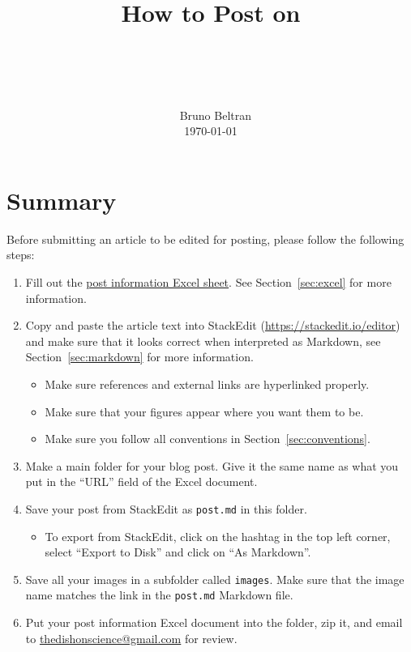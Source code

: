 \documentclass[paper=a4, fontsize=11pt]{scrartcl}
\title{\
        \usefont{OT1}{bch}{b}{n}
        \horrule{0.5pt} \\[0.4cm]
        \huge How to Post on \\ \dishurl{} \\
        \horrule{2pt} \\[0.5cm]
}
\author{\
        \normalfont{}                     \normalsize
        Bruno Beltran\\[-3pt]             \normalsize
        \today
}
\date{}
\numberwithin{equation}{section}        %
\numberwithin{figure}{section}            %
\numberwithin{table}{section}                %
\newcommand{\dishurlplain}[1]{http://thedishonscience.stanford.edu/#1}
\begin{document}
\maketitle

\section{Summary}
Before submitting an article to be edited for posting, please follow the following steps:
\begin{enumerate}
    \item Fill out the
        \href{\dishurlplain{documents/post\_info.xlsx}}{post information
            Excel sheet}. See Section~\ref{sec:excel} for more information.
    \item Copy and paste the article text into StackEdit
    (\url{https://stackedit.io/editor}) and make sure that it looks
    correct when interpreted as Markdown, see Section~\ref{sec:markdown} for more
    information.
        \begin{itemize}
            \item Make sure references and external links are hyperlinked
                properly.
            \item Make sure that your figures appear where you want them to be.
            \item Make sure you follow all conventions in
                Section~\ref{sec:conventions}.
        \end{itemize}
    \item Make a main folder for your blog post. Give it the same name as what
        you put in the ``URL'' field of the Excel document.

    \item Save your post from StackEdit as \texttt{post.md} in this folder.
        \begin{itemize}
            \item To export from StackEdit, click on the hashtag in the top left
                corner, select ``Export to Disk'' and click on ``As Markdown''.
        \end{itemize}
    \item Save all your images in a subfolder called \texttt{images}. Make sure
        that the image name matches the link in the \texttt{post.md} Markdown
        file.
    \item Put your post information Excel document into the folder, zip it, and
        email to
        \href{mailto:thedishonscience@gmail.com}{thedishonscience@gmail.com} for review.
\end{enumerate}
\end{document}
